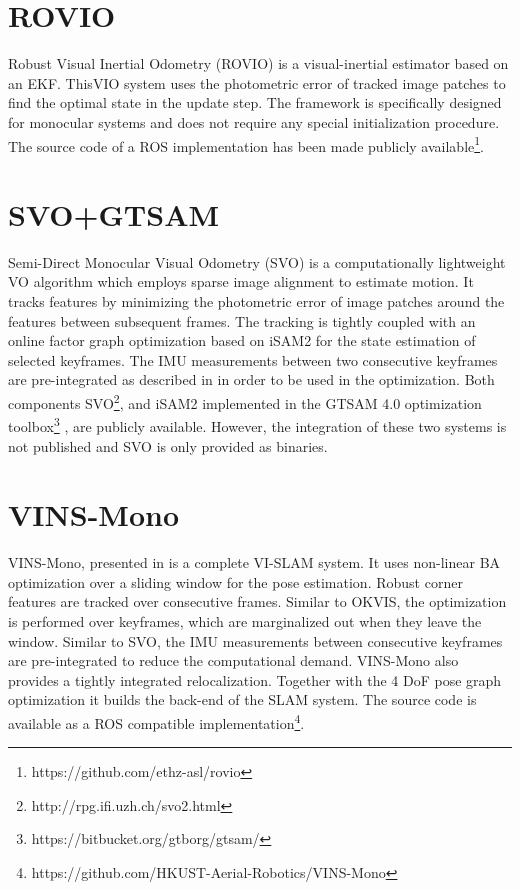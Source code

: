 \section{ROVIO}
Robust Visual Inertial Odometry (ROVIO) \citep{Bloesch2015ROVIO} is a 
visual-inertial estimator based on an \ac{EKF}. This\ac{VIO} system uses 
the photometric error of tracked image patches to find the optimal state in the 
update step. The framework is specifically designed for monocular systems and 
does not require any special initialization procedure. The source code of a 
\ac{ROS} implementation has been made publicly 
available\footnote{https://github.com/ethz-asl/rovio}.  


\section{SVO+GTSAM}
Semi-Direct Monocular Visual Odometry (SVO) \citep{Forster2016SVO} is a 
computationally lightweight \ac{VO} algorithm which employs sparse image 
alignment to estimate motion. It tracks features by minimizing the photometric 
error of image patches around the features between subsequent frames. The 
tracking is tightly coupled with an online factor graph optimization based on 
iSAM2 \citep{Kaess2014iSAM2} for the state estimation of selected keyframes. The 
\ac{IMU} measurements between two consecutive keyframes are pre-integrated as 
described in \citep{Forster2017Manifold} in order to be used in the 
optimization. Both components SVO\footnote{http://rpg.ifi.uzh.ch/svo2.html}, and 
iSAM2 implemented in the GTSAM 4.0 optimization 
toolbox\footnote{https://bitbucket.org/gtborg/gtsam/} \citep{gtsam}, are 
publicly available. However, the integration of these two systems is not 
published and SVO is only provided as binaries.

\section{VINS-Mono}
VINS-Mono, presented in \citep{Qin2017VINS} is a complete VI-\ac{SLAM} system. 
It uses 
non-linear \ac{BA} optimization over a sliding window for the pose estimation. 
Robust corner 
features are tracked over consecutive frames. Similar to OKVIS, the 
optimization 
is performed over keyframes, which are marginalized out when they leave the 
window. Similar to SVO, the \ac{IMU} measurements between consecutive keyframes 
are pre-integrated to reduce the computational demand. VINS-Mono also provides 
a tightly integrated relocalization. Together with the 4 \ac{DoF} pose 
graph optimization it builds the back-end of the \ac{SLAM} system. The source 
code is available as a ROS compatible 
implementation\footnote{https://github.com/HKUST-Aerial-Robotics/VINS-Mono}.


